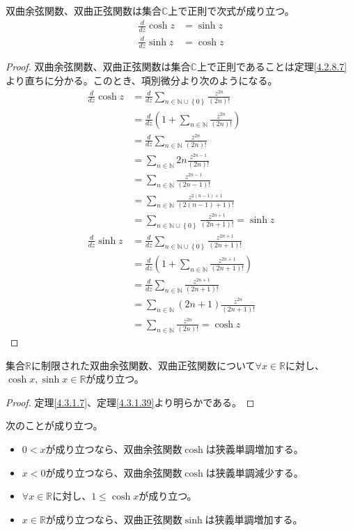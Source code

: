 \documentclass[dvipdfmx]{jsarticle}
\begin{document}
\begin{thm}\label{4.3.1.41}
双曲余弦関数、双曲正弦関数は集合$\mathbb{C}$上で正則で次式が成り立つ。
\begin{align*}
\frac{d}{dz}\cosh z &= \sinh z\\
\frac{d}{dz}\sinh z &= \cosh z
\end{align*}
\end{thm}
\begin{proof}
双曲余弦関数、双曲正弦関数は集合$\mathbb{C}$上で正則であることは定理\ref{4.2.8.7}より直ちに分かる。このとき、項別微分より次のようになる。
\begin{align*}
\frac{d}{dz}\cosh z &= \frac{d}{dz}\sum_{n \in \mathbb{N} \cup \left\{ 0 \right\}} \frac{z^{2n}}{(2n)!}\\
&= \frac{d}{dz}\left( 1 + \sum_{n \in \mathbb{N}} \frac{z^{2n}}{(2n)!} \right)\\
&= \frac{d}{dz}\sum_{n \in \mathbb{N}} \frac{z^{2n}}{(2n)!}\\
&= \sum_{n \in \mathbb{N}} {2n\frac{z^{2n - 1}}{(2n)!}}\\
&= \sum_{n \in \mathbb{N}} \frac{z^{2n - 1}}{(2n - 1)!}\\
&= \sum_{n \in \mathbb{N}} \frac{z^{2(n - 1) + 1}}{\left( 2(n - 1) + 1 \right)!}\\
&= \sum_{n \in \mathbb{N} \cup \left\{ 0 \right\}} \frac{z^{2n + 1}}{(2n + 1)!} = \sinh z\\
\frac{d}{dz}\sinh z &= \frac{d}{dz}\sum_{n \in \mathbb{N} \cup \left\{ 0 \right\}} \frac{z^{2n + 1}}{(2n + 1)!}\\
&= \frac{d}{dz}\left( 1 + \sum_{n \in \mathbb{N}} \frac{z^{2n + 1}}{(2n + 1)!} \right)\\
&= \frac{d}{dz}\sum_{n \in \mathbb{N}} \frac{z^{2n + 1}}{(2n + 1)!}\\
&= \sum_{n \in \mathbb{N}} {(2n + 1)\frac{z^{2n}}{(2n + 1)!}}\\
&= \sum_{n \in \mathbb{N}} \frac{z^{2n}}{(2n)!} = \cosh z
\end{align*}
\end{proof}
\begin{thm}\label{4.3.1.42}
集合$\mathbb{R}$に制限された双曲余弦関数、双曲正弦関数について$\forall x \in \mathbb{R}$に対し、$\cosh x,\sinh x \in \mathbb{R}$が成り立つ。
\end{thm}
\begin{proof} 定理\ref{4.3.1.7}、定理\ref{4.3.1.39}より明らかである。
\end{proof}
\begin{thm}\label{4.3.1.43} 次のことが成り立つ。
\begin{itemize}
\item
  $0 < x$が成り立つなら、双曲余弦関数$\cosh$は狭義単調増加する。
\item
  $x < 0$が成り立つなら、双曲余弦関数$\cosh$は狭義単調減少する。
\item
  $\forall x \in \mathbb{R}$に対し、$1 \leq \cosh x$が成り立つ。
\item
  $x \in \mathbb{R}$が成り立つなら、双曲正弦関数$\sinh$は狭義単調増加する。
\end{itemize}
\end{thm}
\end{document}
